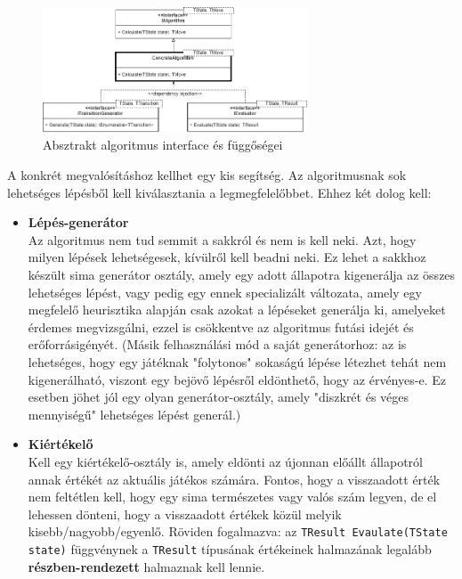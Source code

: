 \documentclass[twoside, a4paper, 12pt]{article}
\begin{document}
\begin{figure}[htbp]
	\centering
	\includegraphics[width=0.7\textwidth]{img/algorithmAbstractDiagram.png}
	\caption{Absztrakt algoritmus interface és függőségei}
	\label{fig:algorithmAbstractDiagram}
\end{figure}

A konkrét megvalósításhoz kellhet egy kis segítség. Az algoritmusnak sok lehetséges lépésből kell kiválasztania a legmegfelelőbbet. Ehhez két dolog kell:

\begin{itemize}
	\item \textbf{Lépés-generátor} \\
	Az algoritmus nem tud semmit a sakkról és nem is kell neki. Azt, hogy milyen lépések lehetségesek, kívülről kell beadni neki. Ez lehet a sakkhoz készült sima generátor osztály, amely egy adott állapotra kigenerálja az összes lehetséges lépést, vagy pedig egy ennek specializált változata, amely egy megfelelő heurisztika alapján csak azokat a lépéseket generálja ki, amelyeket érdemes megvizsgálni, ezzel is csökkentve az algoritmus futási idejét és erőforrásigényét. (Másik felhasználási mód a saját generátorhoz: az is lehetséges, hogy egy játéknak "folytonos" sokaságú lépése létezhet tehát nem kigenerálható, viszont egy bejövő lépésről eldönthető, hogy az érvényes-e. Ez esetben jöhet jól egy olyan generátor-osztály, amely "diszkrét és véges mennyiségű" lehetséges lépést generál.)
	
	\item \textbf{Kiértékelő} \\
	Kell egy kiértékelő-osztály is, amely eldönti az újonnan előállt állapotról annak értékét az aktuális játékos számára. Fontos, hogy a visszaadott érték nem feltétlen kell, hogy egy sima természetes vagy valós szám legyen, de el lehessen dönteni, hogy a visszaadott értékek közül melyik kisebb/nagyobb/egyenlő. Röviden fogalmazva: az \texttt{TResult Evaulate(TState state)} függvénynek a \texttt{TResult} típusának értékeinek halmazának legalább \textbf{részben-rendezett} halmaznak kell lennie.
\end{itemize}
\end{document}
